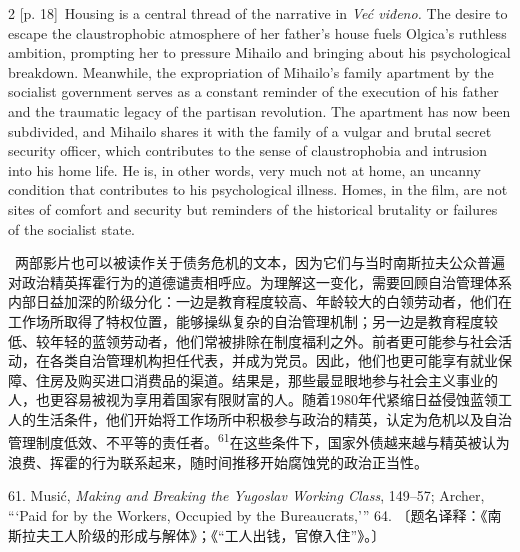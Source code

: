 \documentclass[10pt,a4paper]{article}
\begin{document}
\begin{paracol}{2}
\switchcolumn
{\scriptsize\color{gray} [p. 18]}\ Housing is a central thread of the narrative in \textit{Već viđeno.} The desire to escape the claustrophobic atmosphere of her father’s house fuels Olgica’s ruthless ambition, prompting her to pressure Mihailo and bringing about his psychological breakdown. Meanwhile, the expropriation of Mihailo’s family apartment by the socialist government serves as a constant reminder of the execution of his father and the traumatic legacy of the partisan revolution. The apartment has now been subdivided, and Mihailo shares it with the family of a vulgar and brutal secret security officer, which contributes to the sense of claustrophobia and intrusion into his home life. He is, in other words, very much not at home, an uncanny condition that contributes to his psychological illness. Homes, in the film, are not sites of comfort and security but reminders of the historical brutality or failures of the socialist state.\par
\switchcolumn*
{\scriptsize\color{gray} [p. 18]}\ 两部影片也可以被读作关于债务危机的文本，因为它们与当时南斯拉夫公众普遍对政治精英挥霍行为的道德谴责相呼应。为理解这一变化，需要回顾自治管理体系内部日益加深的阶级分化：一边是教育程度较高、年龄较大的白领劳动者，他们在工作场所取得了特权位置，能够操纵复杂的自治管理机制；另一边是教育程度较低、较年轻的蓝领劳动者，他们常被排除在制度福利之外。前者更可能参与社会活动，在各类自治管理机构担任代表，并成为党员。因此，他们也更可能享有就业保障、住房及购买进口消费品的渠道。结果是，那些最显眼地参与社会主义事业的人，也更容易被视为享用着国家有限财富的人。随着1980年代紧缩日益侵蚀蓝领工人的生活条件，他们开始将工作场所中积极参与政治的精英，认定为危机以及自治管理制度低效、不平等的责任\mbox{者。\textsuperscript{61}}在这些条件下，国家外债越来越与精英被认为浪费、挥霍的行为联系起来，随时间推移开始腐蚀党的政治正当性。\par{\small 61. Musić, \textit{Making and Breaking the Yugoslav Working Class}, 149–57; Archer, “‘Paid for by the Workers, Occupied by the Bureaucrats,’” 64. 〔题名译释：《南斯拉夫工人阶级的形成与解体》；《“工人出钱，官僚入住”》。〕\par}
\switchcolumn

\end{paracol}
\end{document}
